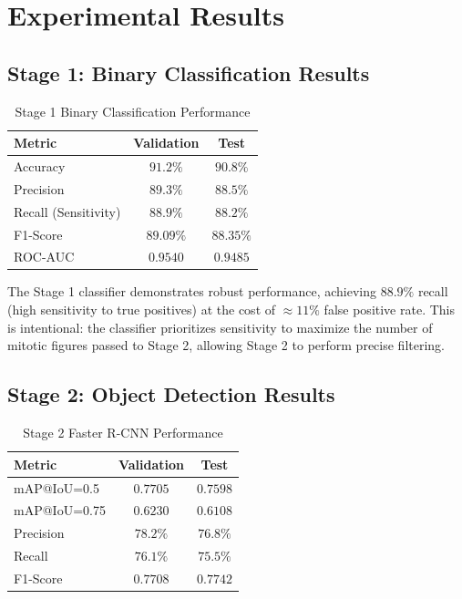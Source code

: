 \documentclass[journal]{IEEEtran}
\begin{document}
\section{Experimental Results}

\subsection{Stage 1: Binary Classification Results}
\begin{table}[!h]
\centering
\begin{tabular}{|l|c|c|}
\hline
\textbf{Metric} & \textbf{Validation} & \textbf{Test} \\
\hline
Accuracy & $91.2\%$ & $90.8\%$ \\
Precision & $89.3\%$ & $88.5\%$ \\
Recall (Sensitivity) & $88.9\%$ & $88.2\%$ \\
F1-Score & $89.09\%$ & $88.35\%$ \\
ROC-AUC & $0.9540$ & $0.9485$ \\
\hline
\end{tabular}
\caption{Stage 1 Binary Classification Performance}
\label{table:stage1_results}
\end{table}

The Stage 1 classifier demonstrates robust performance, achieving $88.9\%$ recall (high sensitivity to true positives) at the cost of $\approx 11\%$ false positive rate. This is intentional: the classifier prioritizes sensitivity to maximize the number of mitotic figures passed to Stage 2, allowing Stage 2 to perform precise filtering.

\subsection{Stage 2: Object Detection Results}
\begin{table}[!h]
\centering
\begin{tabular}{|l|c|c|}
\hline
\textbf{Metric} & \textbf{Validation} & \textbf{Test} \\
\hline
mAP@IoU=0.5 & $0.7705$ & $0.7598$ \\
mAP@IoU=0.75 & $0.6230$ & $0.6108$ \\
Precision & $78.2\%$ & $76.8\%$ \\
Recall & $76.1\%$ & $75.5\%$ \\
F1-Score & $0.7708$ & $0.7742$ \\
\hline
\end{tabular}
\caption{Stage 2 Faster R-CNN Performance}
\label{table:stage2_results}
\end{table}
\end{document}
